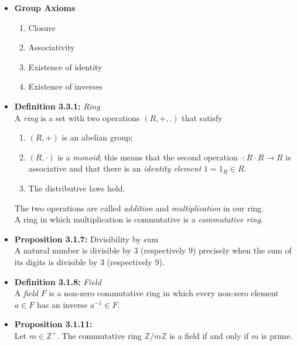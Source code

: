 \documentclass[11pt,a4paper]{article}
\begin{document}
\begin{itemize}

    \item \textbf{Group Axioms}
        \begin{enumerate}
            \item Closure
            \item Associativity
            \item Existence of identity
            \item Existence of inverses
        \end{enumerate}

    \item \textbf{Definition 3.3.1:} \emph{Ring} \\
        A \emph{ring} is a set with two operations $(R,+,.)$ that satisfy
        \begin{enumerate}
            \item $(R,+)$ is an abelian group;
            \item $(R, \cdot)$ is a \emph{monoid}; this means that the second operation
                $\cdot : R \cdot R \to R$ is associative and that there is an
                \emph{identity element} $1=1_R \in R$.
            \item The distributive laws hold.
        \end{enumerate}
        The two operations are called \emph{addition} and \emph{multiplication} in our ring. \\
        A ring in which multiplication is commutative is a \emph{commutative ring}. \\

    \item \textbf{Proposition 3.1.7:} Divisibility by sum \\
        A natural number is divisible by 3 (respectively 9) precisely when the sum of its digits is
        divisible by 3 (respectively 9).

    \item \textbf{Definition 3.1.8:} \emph{Field} \\
        A \emph{field} $F$ is a non-zero commutative ring in which every non-zero element
        $a \in F$ has an inverse $a^{-1} \in F$.

    \item \textbf{Proposition 3.1.11:} \\
        Let $m \in \mathbb{Z}^+$.
        The commutative ring $\mathbb{Z} / m\mathbb{Z}$ is a field if and only if $m$ is prime.
\end{itemize}
\end{document}
